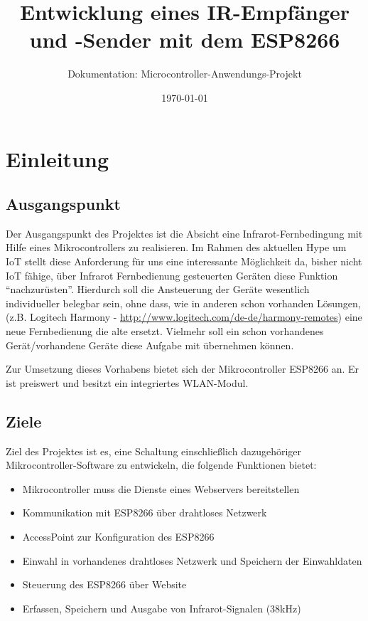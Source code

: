 						




\title{Entwicklung eines IR-Empfänger und -Sender mit dem ESP8266}
\subtitle{Dokumentation: Microcontroller-Anwendungs-Projekt}
\author{} %
\date{\today}

\maketitle

\tableofcontents										%
\pagebreak

\section{Einleitung}
\subsection{Ausgangspunkt}
Der Ausgangspunkt des Projektes ist die Absicht eine Infrarot-Fernbedingung mit Hilfe eines Mikrocontrollers zu realisieren. Im Rahmen des aktuellen Hype um \acs{IoT} stellt diese Anforderung für uns eine interessante Möglichkeit da, bisher nicht \acs{IoT} fähige, über Infrarot Fernbedienung gesteuerten Geräten diese Funktion ``nachzurüsten''. Hierdurch soll die Ansteuerung der Geräte wesentlich individueller belegbar sein, ohne dass, wie in anderen schon vorhanden Lösungen, (z.B. Logitech Harmony - \url{http://www.logitech.com/de-de/harmony-remotes}) eine neue Fernbedienung die alte ersetzt. Vielmehr soll ein schon vorhandenes Gerät/vorhandene Geräte diese Aufgabe mit übernehmen können.

Zur Umsetzung dieses Vorhabens bietet sich der Mikrocontroller ESP8266 an.
Er ist preiswert und besitzt ein integriertes WLAN-Modul.

\subsection{Ziele}
Ziel des Projektes ist es, eine Schaltung einschließlich dazugehöriger Mikrocontroller-Software zu entwickeln, die folgende Funktionen bietet:

\begin{itemize}
	\item Mikrocontroller muss die Dienste eines Webservers bereitstellen
	\item Kommunikation mit ESP8266 über drahtloses Netzwerk
	\item AccessPoint zur Konfiguration des ESP8266
	\item Einwahl in vorhandenes drahtloses Netzwerk und Speichern der Einwahldaten
	\item Steuerung des ESP8266 über Website
	\item Erfassen, Speichern und Ausgabe von Infrarot-Signalen (38kHz)
\end{itemize}

